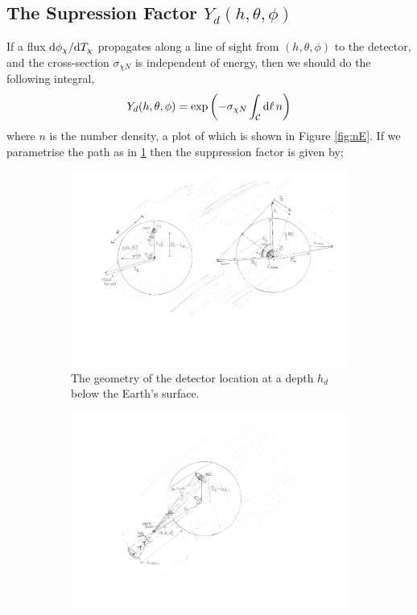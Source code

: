 \documentclass[10pt]{article}
\begin{document}
\subsection{The Supression Factor $Y_d(h, \theta, \phi)$}
If a flux $\text{d} \phi_\chi/\text{d} T_\chi$ propagates along a line of sight from $(h, \theta, \phi)$ to the detector, and the cross-section $\sigma_{\chi N}$ is independent of energy, then we should do the following integral,
\begin{equation}
  \label{eq:yd}
  Y_d(h, \theta, \phi) = \exp\left(-\sigma_{\chi N} \int_{\mathcal{C}}{\text{d}\ell \, n}\right)
\end{equation}
where $n$ is the number density, a plot of which is shown in Figure \ref{fig:nE}. If we parametrise the path as in \ref{fig:dmatt} then the suppression factor is given by;
\begin{center}
  \begin{figure}[h]
    \centering
    \begin{subfigure}[t]{0.45\textwidth}
        \centering
        \includegraphics[width=\textwidth]{dmattenuation.pdf}
        \caption{The geometry of the detector location at a depth $h_d$ below the Earth's surface.}
        \label{fig:dmatt}
    \end{subfigure}%
    \hfill
    \begin{subfigure}[t]{0.45\textwidth}
        \centering
        \includegraphics[width=\textwidth]{pattenuation.pdf}

\end{subfigure}
\end{figure}
\end{center}
\end{document}
